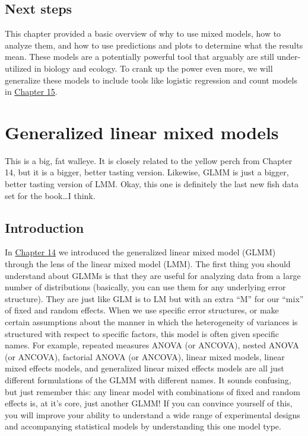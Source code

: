 \documentclass[
]{book}
\begin{document}
\hypertarget{next-14}{%
\section{Next steps}\label{next-14}}

This chapter provided a basic overview of why to use mixed models, how to analyze them, and how to use predictions and plots to determine what the results mean. These models are a potentially powerful tool that arguably are still under-utilized in biology and ecology. To crank up the power even more, we will generalize these models to include tools like logistic regression and count models in \protect\hyperlink{Chapter15}{Chapter 15}.

\hypertarget{Chapter15}{%
\chapter{Generalized linear mixed models}\label{Chapter15}}

This is a big, fat walleye. It is closely related to the yellow perch from Chapter 14, but it is a bigger, better tasting version. Likewise, GLMM is just a bigger, better tasting version of LMM. Okay, this one is definitely the last new fish data set for the book\ldots I think.

\hypertarget{intro-15}{%
\section{Introduction}\label{intro-15}}

In \protect\hyperlink{Chapter14}{Chapter 14} we introduced the generalized linear mixed model (GLMM) through the lens of the linear mixed model (LMM). The first thing you should understand about GLMMs is that they are useful for analyzing data from a large number of distributions (basically, you can use them for any underlying error structure). They are just like GLM is to LM but with an extra ``M'' for our ``mix'' of fixed and random effects. When we use specific error structures, or make certain assumptions about the manner in which the heterogeneity of variances is structured with respect to specific factors, this model is often given specific names. For example, repeated measures ANOVA (or ANCOVA), nested ANOVA (or ANCOVA), factorial ANOVA (or ANCOVA), linear mixed models, linear mixed effects models, and generalized linear mixed effects models are all just different formulations of the GLMM with different names. It sounds confusing, but just remember this: any linear model with combinations of fixed and random effects is, at it's core, just another GLMM! If you can convince yourself of this, you will improve your ability to understand a wide range of experimental designs and accompanying statistical models by understanding this one model type.
\end{document}

